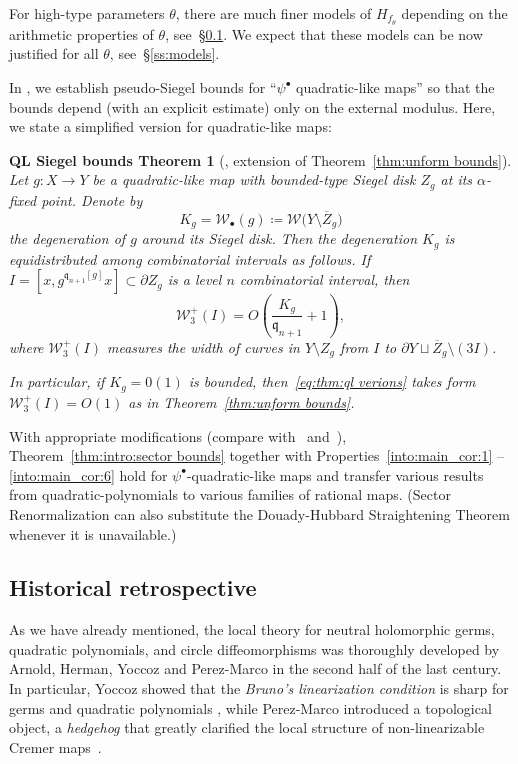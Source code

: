 \documentclass{amsart}
\newcommand{\1}{{\mathbb 1 }}
\newcommand{\Width}{{\mathcal W}}
\newcommand{\qq}{\mathfrak{q}}
\newtheorem{mainthm:psi_ql}[thm]{QL Siegel bounds Theorem}
\theoremstyle{remark}
\numberwithin{equation}{section}
\theoremstyle{definition}
\begin{document}
\noindent For high-type parameters $\theta$, there are much finer models of $H_{f_\theta}$ depending on the arithmetic properties of $\theta$, see~\S\ref{ss:HistRetro}. We expect that these models can be now justified for all $\theta$, see~\S\ref{ss:models}.




In \cite{DL:psi bounds}, we establish pseudo-Siegel bounds for ``$\psi^\bullet$ quadratic-like maps'' so that the bounds depend (with an explicit estimate) only on the external modulus. Here, we state a simplified version for quadratic-like maps:
 
 

\begin{mainthm:psi_ql} [\cite{DL:psi bounds}, extension of Theorem~\ref{thm:unform bounds}] \label{thm:ql verions} Let $g\colon X\to Y$ be a quadratic-like map with bounded-type Siegel disk $Z_g$ at its $\alpha$-fixed point. Denote by \[K_g=\Width_\bullet(g)\coloneqq \Width\big(Y\setminus \overline Z_g\big)\] the degeneration of $g$ around its Siegel disk. Then the degeneration $K_g$ is equidistributed among combinatorial intervals as follows. If $I=[x,g^{\qq_{n+1}[g]}x]\subset \partial Z_g$ is a level $n$ combinatorial interval, then 
\begin{equation}
\label{eq:thm:ql verions}\Width^+_3(I) =O\left(\frac{K_g}{\qq_{n+1}}+1\right),
\end{equation}
where $\Width^+_3(I)$ measures the width of curves in $Y\setminus Z_g$ from $I$ to $\partial Y\sqcup \overline Z_g\setminus (3I)$.

In particular, if $K_g=0(1)$ is bounded, then~\eqref{eq:thm:ql verions} takes form $\Width^+_3(I) =O(1)$ as in Theorem~\ref{thm:unform bounds}.
\end{mainthm:psi_ql}


With appropriate modifications (compare with~\cite{DL:psi bounds} and~\cite{DL:HypComp}), Theorem~\ref{thm:intro:sector bounds} together with Properties~\ref{into:main_cor:1} -- \ref{into:main_cor:6} hold for $\psi^\bullet$-quadratic-like maps and transfer various results from quadratic-polynomials to various families of rational maps. (Sector Renormalization can also  substitute the Douady-Hubbard Straightening Theorem whenever it is unavailable.)


\subsection{Historical retrospective}
\label{ss:HistRetro}
As we have already mentioned, the local theory for neutral holomorphic germs, quadratic polynomials, and circle diffeomorphisms was thoroughly developed by Arnold, Herman, Yoccoz and Perez-Marco in the second half of the last century.
In particular, Yoccoz showed that the {\em Bruno's linearization condition}
is sharp for germs and quadratic polynomials \cite{Y}, while Perez-Marco introduced a topological object,
a {\em hedgehog} that greatly clarified the local structure of non-linearizable
Cremer maps~\cite{PM}.
\end{document}
